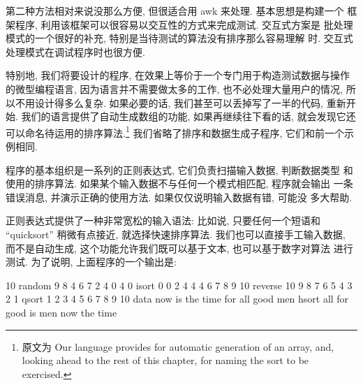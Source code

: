 第二种方法相对来说没那么方便, 但很适合用 awk 来处理. 基本思想是构建一个
框架程序, 利用该框架可以很容易以交互性的方式来完成测试. 交互式方案是
批处理模式的一个很好的补充, 特别是当待测试的算法没有排序那么容易理解
时. 交互式处理模式在调试程序时也很方便.

特别地, 我们将要设计的程序, 在效果上等价于一个专门用于构造测试数据与操作
的微型编程语言, 因为语言并不需要做太多的工作, 也不必处理大量用户的情况,
所以不用设计得多么复杂. 如果必要的话, 我们甚至可以丢掉写了一半的代码,
重新开始. 我们的语言提供了自动生成数组的功能, 如果再继续往下看的话, 
就会发现它还可以命名待运用的排序算法.\footnote{原文为 Our language provides
    for automatic generation of an array, and, looking ahead to the rest of
    this chapter, for naming the sort to be exercised.}
我们省略了排序和数据生成子程序, 它们和前一个示例相同.

程序的基本组织是一系列的正则表达式, 它们负责扫描输入数据, 判断数据类型
和使用的排序算法. 如果某个输入数据不与任何一个模式相匹配, 程序就会输出
一条错误消息, 并演示正确的使用方法. 如果仅仅说明输入数据有错, 可能没
多大帮助.

正则表达式提供了一种非常宽松的输入语法: 比如说, 只要任何一个短语和
``quicksort''
稍微有点接近, 就选择快速排序算法. 我们也可以直接手工输入数据,
而不是自动生成, 这个功能允许我们既可以基于文本, 也可以基于数字对算法
进行测试. 为了说明, 上面程序的一个输出是:
\begin{shell}
    10 random
     9 8 4 6 7 2 4 0 4 0
    isort
     0 0 2 4 4 4 6 7 8 9
    10 reverse
     10 9 8 7 6 5 4 3 2 1
    qsort
     1 2 3 4 5 6 7 8 9 10
    data now is the time for all good men
    hsort
     all for good is men now the time
\end{shell}

